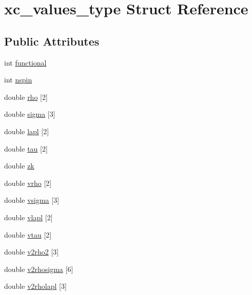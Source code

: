 \hypertarget{structxc__values__type}{\section{xc\-\_\-values\-\_\-type Struct Reference}
\label{structxc__values__type}
}
\subsection*{Public Attributes}
\begin{DoxyCompactItemize}
\item 
int \hyperlink{structxc__values__type_a89b7246e52d0672ae31f8dbb852f2d32}{functional}
\item 
int \hyperlink{structxc__values__type_ac114cc7665095c94537b4e940b3f6dd7}{nspin}
\item 
double \hyperlink{structxc__values__type_ab01263a947376686e908a318ccd92d1f}{rho} \mbox{[}2\mbox{]}
\item 
double \hyperlink{structxc__values__type_abb97f39162aebec8ed756ba3919fd78e}{sigma} \mbox{[}3\mbox{]}
\item 
double \hyperlink{structxc__values__type_a6f3b62347fd67edb7092b1bb8e156c97}{lapl} \mbox{[}2\mbox{]}
\item 
double \hyperlink{structxc__values__type_a55dca9d3fdf8968aa398beac26beb17f}{tau} \mbox{[}2\mbox{]}
\item 
double \hyperlink{structxc__values__type_a31b0888d60141aac90a16f6bdde009de}{zk}
\item 
double \hyperlink{structxc__values__type_af1dfd9ff0241f58740bbe6475db412d5}{vrho} \mbox{[}2\mbox{]}
\item 
double \hyperlink{structxc__values__type_a3bf334d0a9a7ca51331d89e0e1e86ff9}{vsigma} \mbox{[}3\mbox{]}
\item 
double \hyperlink{structxc__values__type_a70c611a0d51a0ab564661ae20ff9a184}{vlapl} \mbox{[}2\mbox{]}
\item 
double \hyperlink{structxc__values__type_a325f2638089774311f5226f1d678c0dd}{vtau} \mbox{[}2\mbox{]}
\item 
double \hyperlink{structxc__values__type_a5ffd75ad934d5a86d5a1ac0eeeb0b4f4}{v2rho2} \mbox{[}3\mbox{]}
\item 
double \hyperlink{structxc__values__type_a285538448545f260b44cffca58507136}{v2rhosigma} \mbox{[}6\mbox{]}
\item 
double \hyperlink{structxc__values__type_a0a7c7bdba0084f104424fa4bb850b968}{v2rholapl} \mbox{[}3\mbox{]}

\end{DoxyCompactItemize}
